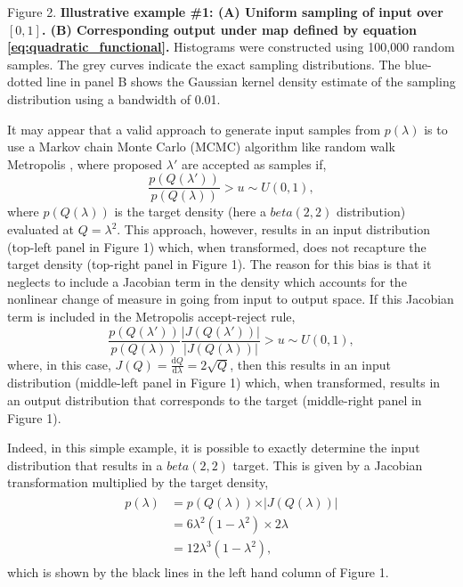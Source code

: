 \documentclass[10pt,letterpaper]{article}
\begin{document}
\vspace{0.5cm}

Figure 2. \textbf{Illustrative example \#1: (A) Uniform sampling of input over $[0,1]$. (B) Corresponding output under map defined by equation \eqref{eq:quadratic_functional}.} Histograms were constructed using 100,000 random samples. The grey curves indicate the exact sampling distributions. The blue-dotted line in panel B shows the Gaussian kernel density estimate of the sampling distribution using a bandwidth of 0.01.

\vspace{0.5cm}

It may appear that a valid approach to generate input samples from $p(\lambda)$ is to use a Markov chain Monte Carlo (MCMC) algorithm like random walk Metropolis \cite{metropolis1953equation}, where proposed $\lambda'$ are accepted as samples if,
%
\begin{equation}\label{eq:naiveMetropolis}
\frac{p(Q(\lambda'))}{p(Q(\lambda))}>u\sim U(0,1),
\end{equation}
%
where $p(Q(\lambda))$ is the target density (here a $beta(2,2)$ distribution) evaluated at $Q=\lambda^{2}$. This approach, however, results in an input distribution (top-left panel in Figure 1) which, when transformed, does not recapture the target density (top-right panel in Figure 1). The reason for this bias is that it neglects to include a Jacobian term in the density which accounts for the nonlinear change of measure in going from input to output space. If this Jacobian term is included in the Metropolis accept-reject rule,
%
\begin{equation}\label{eq:jacobianMetropolis}
\frac{p(Q(\lambda'))}{p(Q(\lambda))}\frac{\vert J(Q(\lambda')) \vert}{\vert J(Q(\lambda)) \vert}>u\sim U(0,1),
\end{equation}
%
where, in this case, $J(Q) = \frac{\mathrm{d}Q}{\mathrm{d}\lambda} =  2 \sqrt{Q}$, then this results in an input distribution (middle-left panel in Figure 1) which, when transformed, results in an output distribution that corresponds to the target (middle-right panel in Figure 1).

Indeed, in this simple example, it is possible to exactly determine the input distribution that results in a $beta(2,2)$ target. This is given by a Jacobian transformation multiplied by the target density,
%
\begin{equation}
\begin{gathered}\begin{aligned}
p(\lambda) &= p(Q(\lambda)) \times \vert J(Q(\lambda)) \vert   \\
           &= 6 \lambda^2 (1 - \lambda^2) \times 2 \lambda     \\
           & = 12 \lambda^3 (1- \lambda^2),
\end{aligned} \end{gathered}
\end{equation}
%
which is shown by the black lines in the left hand column of Figure 1.
\end{document}
